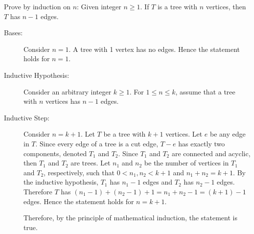 \documentclass{article}
\theoremstyle{definition}
\begin{document}
\begin{question}
    Prove by induction on $n$: Given integer $n\geq 1$. If  $T$ is a tree with $n$ vertices, then $T$ has $n-1$ edges. 
\end{question}
\begin{solution}
\begin{description}
	\item[Bases:] Consider $n=1$. A tree with 1 vertex has no edges. Hence the statement holds for $n=1$.
	\item[Inductive Hypothesis:] Consider an arbitrary integer $k\geq1$. For $1\leq n \leq k$, assume that a tree with $n$ vertices has $n-1$ edges.
	\item[Inductive Step:] Consider $n=k+1$. Let $T$ be a tree with $k+1$ vertices. Let $e$ be any edge in $T$. Since every edge of a tree is a cut edge, $T-e$ has exactly two components, denoted $T_1$ and $T_2$. Since $T_1$ and $T_2$ are connected and acyclic, then $T_1$ and $T_2$ are trees. Let $n_1$ and $n_2$ be the number of vertices in $T_1$ and $T_2$, respectively, such that $0<n_1, n_2<k+1$ and $n_1+n_2=k+1$. By the inductive hypothesis, $T_1$ has $n_1-1$ edges and $T_2$ has $n_2-1$ edges. Therefore $T$ has $(n_1-1) + (n_2-1) + 1 = n_1+n_2-1= (k+1) - 1$ edges. Hence the statement holds for $n=k+1$.
	
	Therefore, by the principle of mathematical induction, the statement is true.
\end{description}
\end{solution}
\end{document}
